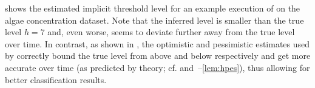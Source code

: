  shows the estimated implicit threshold
level for an example execution of \istr on the algae concentration
dataset. Note that the inferred level
is smaller than the true level $h = 7$ and, even worse, seems to
deviate further away from the true level over time.
In contrast, as shown in , the optimistic
and pessimistic estimates used by \iacl correctly bound the true level
from above and below respectively and get more accurate over time
(as predicted by theory; cf. 
and~--\ref{lem:hpes}),
thus allowing for better classification results.

